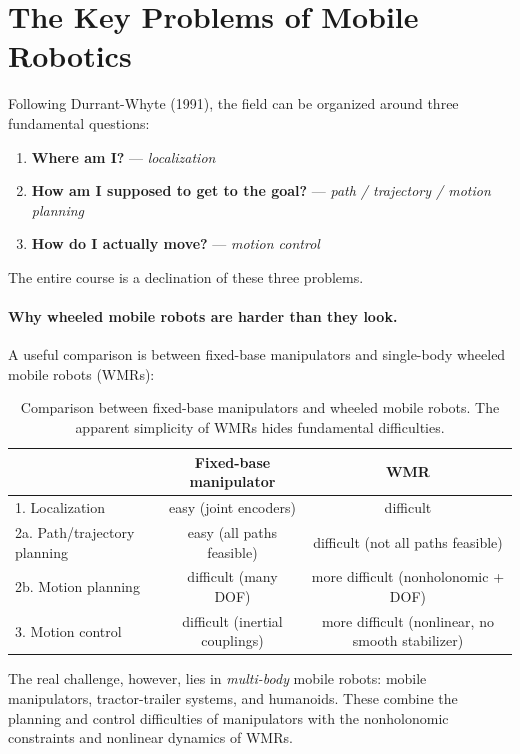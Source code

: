 \section{The Key Problems of Mobile Robotics}
\label{sec:key-problems}

Following Durrant-Whyte (1991), the field can be organized around three
fundamental questions:

\begin{enumerate}
    \item \textbf{Where am I?} --- \emph{localization}
    \item \textbf{How am I supposed to get to the goal?} ---
          \emph{path / trajectory / motion planning}
    \item \textbf{How do I actually move?} --- \emph{motion control}
\end{enumerate}

The entire course is a declination of these three problems.

\paragraph{Why wheeled mobile robots are harder than they look.}
A useful comparison is between fixed-base manipulators and single-body
wheeled mobile robots (WMRs):

\begin{table}[h]
\centering
\begin{tabular}{lcc}
\toprule
 & \textbf{Fixed-base manipulator} & \textbf{WMR} \\
\midrule
1. Localization              & easy (joint encoders)   & difficult \\
2a. Path/trajectory planning & easy (all paths feasible) & difficult (not all paths feasible) \\
2b. Motion planning          & difficult (many DOF)    & more difficult (nonholonomic + DOF) \\
3. Motion control            & difficult (inertial couplings) & more difficult (nonlinear, no smooth stabilizer) \\
\bottomrule
\end{tabular}
\caption{Comparison between fixed-base manipulators and wheeled mobile
robots. The apparent simplicity of WMRs hides fundamental difficulties.}
\label{tab:manipulator-vs-wmr}
\end{table}

The real challenge, however, lies in \emph{multi-body} mobile robots:
mobile manipulators, tractor-trailer systems, and humanoids. These
combine the planning and control difficulties of manipulators with the
nonholonomic constraints and nonlinear dynamics of WMRs.

